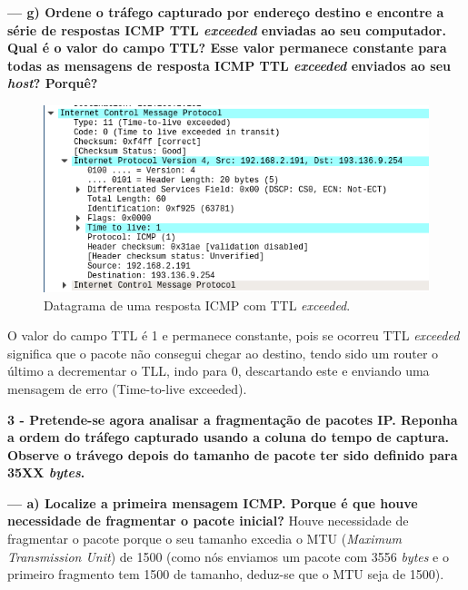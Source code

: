 \documentclass[a4paper]{article}
\begin{document}
\vspace{1cm}
\newpage

\textbf{--- g) Ordene o tráfego capturado por endereço destino e encontre a série de respostas ICMP TTL \textit{exceeded} enviadas ao seu computador. Qual é o valor do campo TTL? Esse valor permanece constante para todas as mensagens de resposta ICMP TTL \textit{exceeded} enviados ao seu \textit{host}? Porquê?}\newline
\begin{figure}[h]
    \centering
    \includegraphics[scale=0.7]{pic12.png}
    \caption{Datagrama de uma resposta ICMP com TTL \textit{exceeded}.}
    \label{fig:my_label}
\end{figure}
O valor do campo TTL é 1 e permanece constante, pois se ocorreu TTL \textit{exceeded} significa que o pacote não consegui chegar ao destino, tendo sido um router o último a decrementar o TLL, indo para 0, descartando este e enviando uma mensagem de erro (Time-to-live exceeded).

\vspace{1cm}
\clearpage

\textbf{3 - Pretende-se agora analisar a fragmentação de pacotes IP. Reponha a ordem do tráfego capturado usando a coluna do tempo de captura. Observe o trávego depois do tamanho de pacote ter sido definido para 35XX \textit{bytes}.}\newline
\vspace{1cm}

\textbf{--- a) Localize a primeira mensagem ICMP. Porque é que houve necessidade de fragmentar o pacote inicial?}\newline
Houve necessidade de fragmentar o pacote porque o seu tamanho excedia o MTU (\textit{Maximum Transmission Unit}) de 1500 (como nós enviamos um pacote com 3556 \textit{bytes} e o primeiro fragmento tem 1500 de tamanho, deduz-se que o MTU seja de 1500).
\end{document}
